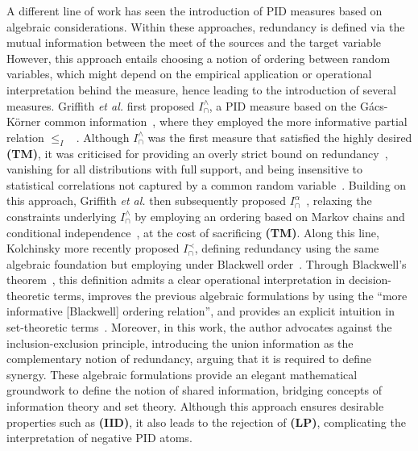 \documentclass{article}
\makeatletter
\newcommand{\etal}{\textit{et al.\@} }
\newcommand{\IID}{\textbf{(IID)}\xspace} %
\newcommand{\TM}{\textbf{(TM)}\xspace} %
\newcommand{\LP}{\textbf{(LP)}\xspace}
\newcommand{\Iwedge}{\ensuremath{I_\cap^{\wedge}}\xspace}
\newcommand{\Ialpha}{\ensuremath{I_\cap^{\alpha}}\xspace}
\newcommand{\Iprec}{\ensuremath{I_\cap^{\prec}}\xspace}
\makeatother
\begin{document}
A different line of work has seen the introduction of PID measures based on algebraic considerations. Within these approaches, redundancy is defined via the mutual information between the meet of the sources and the target variable
However, this approach entails choosing a notion of ordering between random variables, which might depend on the empirical application or operational interpretation behind the measure, hence leading to the introduction of several measures.  
Griffith \etal first proposed \Iwedge, a PID measure based on the Gács-Körner common information~\cite{wolf2004zero}, where they employed the more informative partial relation $\le_I$  ~\cite{griffith2014quantifying}. Although \Iwedge was the first measure that satisfied the highly desired \TM, it was criticised for providing an overly strict bound on redundancy~\cite{griffith2015quantifying, kolchinsky2022novel}, vanishing for all distributions with full support, and being insensitive to statistical correlations not captured by a common random variable~\cite{james2018unique}.
Building on this approach, Griffith \etal then subsequently proposed \Ialpha~\cite{griffith2015quantifying}, relaxing the constraints underlying \Iwedge by employing an ordering based on Markov chains and conditional independence~\cite{griffith2015quantifying, kolchinsky2022novel}, at the cost of sacrificing \TM. 
Along this line, Kolchinsky more recently proposed \Iprec, defining redundancy using the same algebraic foundation but employing under Blackwell order~\cite{kolchinsky2022novel}. Through Blackwell's theorem~\cite{blackwell1953equivalent}, this definition admits a clear operational interpretation in decision-theoretic terms, improves the previous algebraic formulations by using the ``more informative [Blackwell] ordering relation'', and provides an explicit intuition in set-theoretic terms~\cite{kolchinsky2022novel}. Moreover, in this work, the author advocates against the inclusion-exclusion principle, introducing the union information as the complementary notion of redundancy, arguing that it is required to define synergy.
These algebraic formulations provide an elegant mathematical groundwork to define the notion of shared information, bridging concepts of information theory and set theory. Although this approach ensures desirable properties such as \IID, it also leads to the rejection of \LP, complicating the interpretation of negative PID atoms. 
\end{document}
